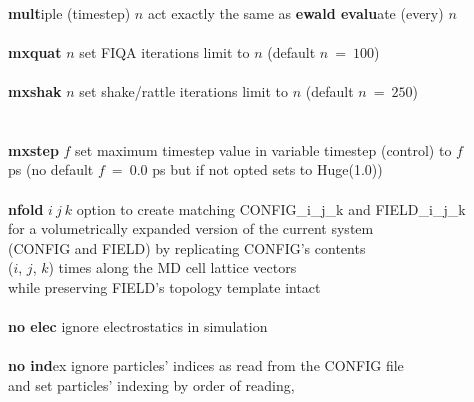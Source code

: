 \begin{tabbing}
\>                                              \> \\
\> {\bf mult}iple (timestep) $n$                \> act exactly the same as {\bf ewald evalu}ate (every) $n$ \\
\>                                              \> \\
\> {\bf mxquat} $n$                             \> set FIQA iterations limit to $n$ (default $n~=~100$) \\
\>                                              \> \\
\> {\bf mxshak} $n$                             \> set shake/rattle iterations limit to $n$ (default $n~=~250$) \\
\>                                              \> \\
\>                                              \> \\
\> {\bf mxstep} $f$                             \> set maximum timestep value in variable timestep (control) to $f$ \\
\>                                              \> ps (no default $f~=~0.0$ ps but if not opted sets to Huge(1.0)) \\
\>                                              \> \\
\> {\bf nfold} $i~j~k$                          \> option to create matching CONFIG\_i\_j\_k and FIELD\_i\_j\_k \\
\>                                              \> for a volumetrically expanded version of the current system \\
\>                                              \> (CONFIG and FIELD) by replicating CONFIG's contents \\
\>                                              \> ($i$, $j$, $k$) times along the MD cell lattice vectors \\
\>                                              \> while preserving FIELD's topology template intact \\
\>                                              \> \\
\> {\bf no elec}                                \> ignore electrostatics in simulation \\
\>                                              \> \\
\> {\bf no ind}ex                               \> ignore particles' indices as read from the CONFIG file \\
\>                                              \> and set particles' indexing by order of reading, \\

\end{tabbing}
